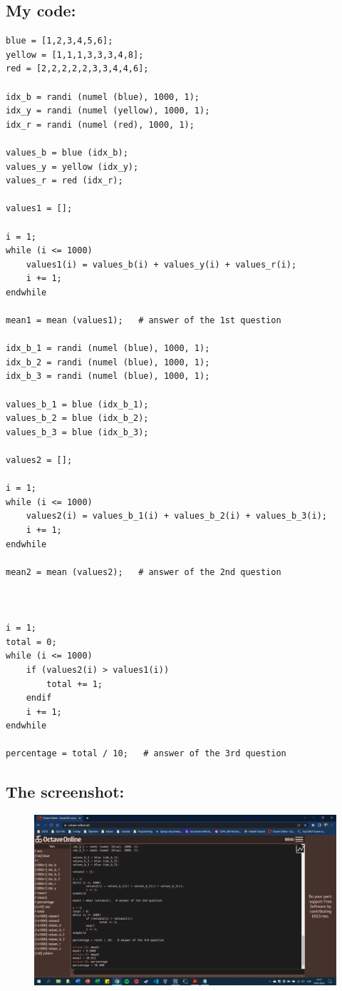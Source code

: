 \documentclass[12pt]{article}
\begin{document}
\subsection*{My code:}
\begin{Verbatim}[tabsize=4]
blue = [1,2,3,4,5,6];
yellow = [1,1,1,3,3,3,4,8];
red = [2,2,2,2,2,3,3,4,4,6];

idx_b = randi (numel (blue), 1000, 1);
idx_y = randi (numel (yellow), 1000, 1);
idx_r = randi (numel (red), 1000, 1);

values_b = blue (idx_b);
values_y = yellow (idx_y);
values_r = red (idx_r);

values1 = [];

i = 1;
while (i <= 1000)
	values1(i) = values_b(i) + values_y(i) + values_r(i);
	i += 1;
endwhile

mean1 = mean (values1);   # answer of the 1st question

idx_b_1 = randi (numel (blue), 1000, 1);
idx_b_2 = randi (numel (blue), 1000, 1);
idx_b_3 = randi (numel (blue), 1000, 1);

values_b_1 = blue (idx_b_1);
values_b_2 = blue (idx_b_2);
values_b_3 = blue (idx_b_3);

values2 = [];

i = 1;
while (i <= 1000)
	values2(i) = values_b_1(i) + values_b_2(i) + values_b_3(i);
	i += 1;
endwhile

mean2 = mean (values2);   # answer of the 2nd question



i = 1;
total = 0;
while (i <= 1000)
	if (values2(i) > values1(i))
		total += 1;
	endif
	i += 1;
endwhile

percentage = total / 10;   # answer of the 3rd question
\end{Verbatim}

\vspace{3cm}
\subsection*{The screenshot:}
\begin{figure}[htbp]
\centerline{\includegraphics[scale=.5]{222.png}}
\end{figure}
\end{document}
